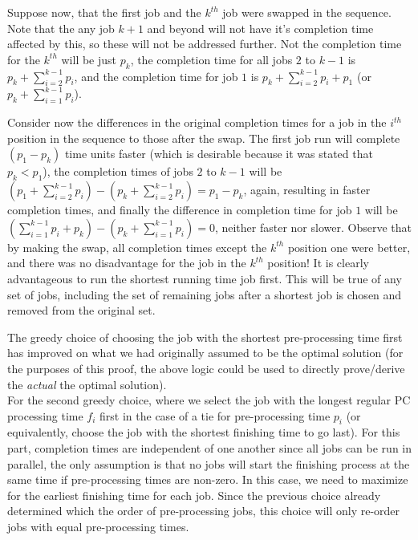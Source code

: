\documentclass[11pts]{article}
\begin{document}
\begin{enumerate}
  Suppose now, that the first job and the $k^{th}$ job were swapped in
  the sequence. Note that the any job $k+1$ and beyond will not have it's
  completion time affected by this, so these will not be addressed further.
  Not the completion time for the $k^{th}$ will be  just $p_k$, the completion
  time for all jobs $2$ to $k-1$ is  $p_k + \sum_{i=2}^{k-1}{p_{i}}$, and the
  completion time for job $1$ is
  $p_k + \sum_{i=2}^{k-1}{p_{i}} + p_1$ (or $p_k + \sum_{i=1}^{k-1}{p_{i}}$).

  Consider now the differences in the original completion times for a job
  in the $i^{th}$ position in the sequence to those after the swap. The
  first job run will complete $(p_1 - p_k)$ time units faster (which is
  desirable because it was stated that $p_k < p_1$), the completion times
  of jobs $2$ to $k-1$ will be
  $(p_1 + \sum_{i=2}^{k-1}{p_{i}}) - (p_k +
    \sum_{i=2}^{k-1}{p_{i}}) = p_1 - p_k$, again, resulting in faster
  completion times, and finally the difference in completion time for
  job $1$ will be
  $(\sum_{i=1}^{k-1}{p_{i}} + p_k) - (p_k + \sum_{i=1}^{k-1}{p_{i}}) = 0$,
  neither faster nor slower. Observe that by making the swap, all completion
  times except the $k^{th}$ position one were better, and there was no
  disadvantage for the job in the $k^{th}$ position! It is clearly
  advantageous to run the shortest running time job first. This will be true of
  any set of jobs, including the set of remaining jobs after a shortest job
  is chosen and removed from the original set.

  The greedy choice of choosing the job with the shortest pre-processing
  time first has improved on what we had originally assumed to be the
  optimal solution (for the purposes of this proof, the above logic could
  be used to directly prove/derive the \emph{actual} the optimal solution). \\

  For the second greedy choice, where we select the job with the longest
  regular PC processing time $f_i$ first in the case of a tie for
  pre-processing time $p_i$ (or equivalently, choose the job with the
  shortest finishing time to go last). For this part, completion times
  are independent of one another since all jobs can be run in parallel,
  the only assumption is that no jobs will start the finishing process at
  the same time if pre-processing times are non-zero. In this case, we need
  to maximize for the earliest finishing time for each job. Since the
  previous choice already determined which the order of pre-processing
  jobs, this choice will only re-order jobs with equal pre-processing times.


\end{enumerate}
\end{document}
